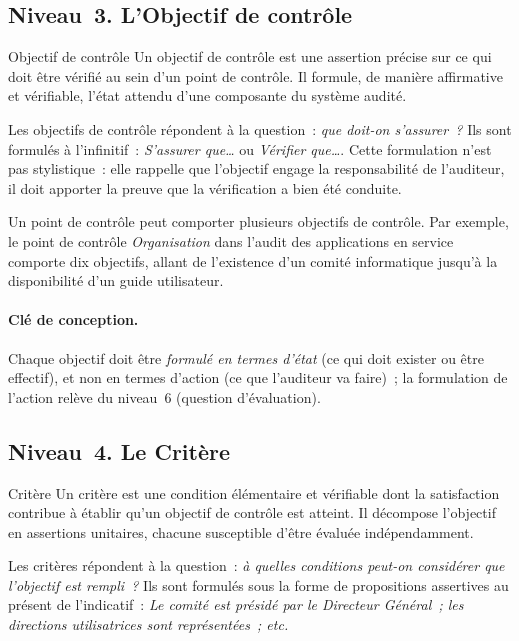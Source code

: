 \subsection{Niveau~3. L'Objectif de contrôle}

\begin{boxdef}{Objectif de contrôle}
Un objectif de contrôle est une assertion précise sur ce qui doit être vérifié
au sein d'un point de contrôle. Il formule, de manière affirmative et
vérifiable, l'état attendu d'une composante du système audité.
\end{boxdef}

Les objectifs de contrôle répondent à la question~: \emph{que doit-on
s'assurer~?} Ils sont formulés à l'infinitif~: \emph{S'assurer que\ldots} ou
\emph{Vérifier que\ldots}. Cette formulation n'est pas stylistique~: elle
rappelle que l'objectif engage la responsabilité de l'auditeur, il doit
apporter la preuve que la vérification a bien été conduite.

Un point de contrôle peut comporter plusieurs objectifs de contrôle. Par
exemple, le point de contrôle \emph{Organisation} dans l'audit des applications
en service comporte dix objectifs, allant de l'existence d'un comité
informatique jusqu'à la disponibilité d'un guide utilisateur.

\paragraph{Clé de conception.}
Chaque objectif doit être \emph{formulé en termes d'état} (ce qui doit exister
ou être effectif), et non en termes d'action (ce que l'auditeur va faire)~; la
formulation de l'action relève du niveau~6 (question d'évaluation).

\subsection{Niveau~4. Le Critère}

\begin{boxdef}{Critère}
Un critère est une condition élémentaire et vérifiable dont la satisfaction
contribue à établir qu'un objectif de contrôle est atteint. Il décompose
l'objectif en assertions unitaires, chacune susceptible d'être évaluée
indépendamment.
\end{boxdef}

Les critères répondent à la question~: \emph{à quelles conditions peut-on
considérer que l'objectif est rempli~?} Ils sont formulés sous la forme de
propositions assertives au présent de l'indicatif~: \emph{Le comité est présidé
par le Directeur Général~; les directions utilisatrices sont représentées~;
etc.}

